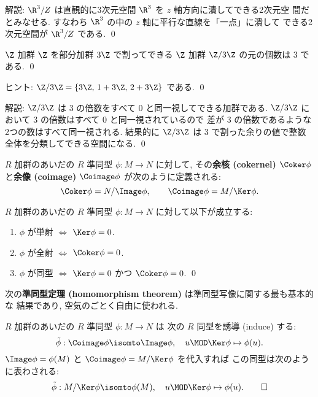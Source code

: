 \documentclass[12pt,twoside]{jarticle}
\begin{document}
\medskip
\noindent
解説: $\R^3/Z$ は直観的に3次元空間 $\R^3$ を $z$ 軸方向に潰してできる2次元空
間だとみなせる. すなわち $\R^3$ の中の $z$ 軸に平行な直線を「一点」に潰して
できる2次元空間が $\R^3/Z$ である.
\qed


\begin{question}
  $\Z$ 加群 $\Z$ を部分加群 $3\Z$ で割ってできる $\Z$ 加群 $\Z/3\Z$ 
  の元の個数は $3$ である.
  \qed
\end{question}

\noindent
ヒント: $\Z/3\Z=\{3\Z,\, 1+3\Z,\, 2+3\Z\}$ である. 
\qed

\medskip
\noindent
解説: $\Z/3\Z$ は $3$ の倍数をすべて $0$ と同一視してできる加群である.
$\Z/3\Z$ において $3$ の倍数はすべて $0$ と同一視されているので
差が $3$ の倍数であるような2つの数はすべて同一視される.
結果的に $\Z/3\Z$ は $3$ で割った余りの値で整数全体を分類してできる空間になる. 
\qed

\bigskip

$R$ 加群のあいだの $R$ 準同型 $\phi:M\to N$ に対して, 
その{\bf 余核 (cokernel)} $\Coker\phi$ と{\bf 余像 (coimage)} $\Coimage\phi$ 
が次のように定義される: 
\begin{equation*}
  \Coker\phi = N/\Image\phi,
  \qquad
  \Coimage\phi = M/\Ker\phi.
\end{equation*}

\begin{question}
  $R$ 加群のあいだの $R$ 準同型 $\phi:M\to N$ に対して以下が成立する:
  \begin{enumerate}
  \item $\phi$ が単射 $\iff$ $\Ker\phi=0$.
  \item $\phi$ が全射 $\iff$ $\Coker\phi=0$.
  \item $\phi$ が同型 $\iff$ $\Ker\phi=0$ かつ $\Coker\phi=0$.
    \qed
  \end{enumerate}
\end{question}


次の{\bf 準同型定理 (homomorphism theorem)} は準同型写像に関する最も基本的な
結果であり, 空気のごとく自由に使われる.

\begin{question}[加群の準同型定理]
  $R$ 加群のあいだの $R$ 準同型 $\phi:M\to N$ は
  次の $R$ 同型を誘導 (induce) する:
  \begin{equation*}
    \tilde\phi:
    \Coimage\phi \isomto \Image\phi,
    \quad
    u\MOD\Ker\phi \mapsto \phi(u).
  \end{equation*}
  $\Image\phi=\phi(M)$ と $\Coimage\phi=M/\Ker\phi$ を代入すれば
  この同型は次のように表わされる:
  \begin{equation*}
    \tilde\phi:
    M/\Ker\phi \isomto \phi(M),
    \quad
    u\MOD\Ker\phi \mapsto \phi(u).
    \qed
  \end{equation*}
\end{question}
\end{document}
